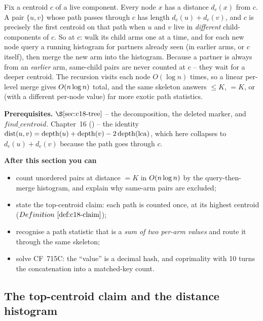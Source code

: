 \begin{topicintro}
Fix a centroid \(c\) of a live component. Every node \(x\) has a distance
\(d_c(x)\) from \(c\). A pair \(\{u,v\}\) whose path passes through \(c\) has
length \(d_c(u)+d_c(v)\), and \(c\) is precisely the first centroid on that path
when \(u\) and \(v\) live in \emph{different} child-components of \(c\). So at
\(c\): walk its child arms one at a time, and for each new node query a running
histogram for partners already seen (in earlier arms, or \(c\) itself), then merge
the new arm into the histogram. Because a partner is always from an
\emph{earlier} arm, same-child pairs are never counted at \(c\) -- they wait for a
deeper centroid. The recursion visits each node \(O(\log n)\) times, so a linear
per-level merge gives \(O(n\log n)\) total, and the same skeleton answers
\(\le K\), \(=K\), or (with a different per-node value) far more exotic path
statistics.

\textbf{Prerequisites.} \(\secref{c18-tree}\) -- the decomposition, the deleted
marker, and \(\mathit{find\_centroid}\). Chapter~16 () -- the identity
\(\operatorname{dist}(u,v)=\operatorname{depth}(u)+\operatorname{depth}(v)-2\operatorname{depth}(\operatorname{lca})\), which here collapses to
\(d_c(u)+d_c(v)\) because the path goes through \(c\).

\textbf{After this section you can}
\begin{itemize}[nosep]
  \item count unordered pairs at distance \(=K\) in \(O(n\log n)\) by the
        query-then-merge histogram, and explain why same-arm pairs are excluded; \hfill{}
  \item state the top-centroid claim: each path is counted once, at its highest
        centroid (\(\defref{c18-claim}\)); \hfill{}
  \item recognise a path statistic that is a \emph{sum of two per-arm values} and
        route it through the same skeleton; \hfill{}
  \item solve CF~715C: the ``value'' is a decimal hash, and coprimality with 10
        turns the concatenation into a matched-key count. \hfill{}
\end{itemize}
\end{topicintro}

\subsection{The top-centroid claim and the distance histogram}

